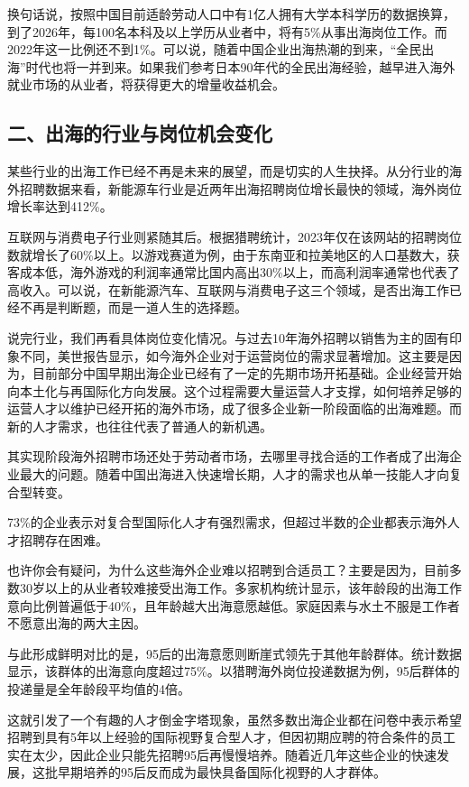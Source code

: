 换句话说，按照中国目前适龄劳动人口中有1亿人拥有大学本科学历的数据换算，到了2026年，每100名本科及以上学历从业者中，将有5\%从事出海岗位工作。而2022年这一比例还不到1\%。可以说，随着中国企业出海热潮的到来，“全民出海”时代也将一并到来。如果我们参考日本90年代的全民出海经验，越早进入海外就业市场的从业者，将获得更大的增量收益机会。

\subsection{二、出海的行业与岗位机会变化}

某些行业的出海工作已经不再是未来的展望，而是切实的人生抉择。从分行业的海外招聘数据来看，新能源车行业是近两年出海招聘岗位增长最快的领域，海外岗位增长率达到412\%。

互联网与消费电子行业则紧随其后。根据猎聘统计，2023年仅在该网站的招聘岗位数就增长了60\%以上。以游戏赛道为例，由于东南亚和拉美地区的人口基数大，获客成本低，海外游戏的利润率通常比国内高出30\%以上，而高利润率通常也代表了高收入。可以说，在新能源汽车、互联网与消费电子这三个领域，是否出海工作已经不再是判断题，而是一道人生的选择题。

说完行业，我们再看具体岗位变化情况。与过去10年海外招聘以销售为主的固有印象不同，美世报告显示，如今海外企业对于运营岗位的需求显著增加。这主要是因为，目前部分中国早期出海企业已经有了一定的先期市场开拓基础。企业经营开始向本土化与再国际化方向发展。这个过程需要大量运营人才支撑，如何培养足够的运营人才以维护已经开拓的海外市场，成了很多企业新一阶段面临的出海难题。而新的人才需求，也往往代表了普通人的新机遇。

其实现阶段海外招聘市场还处于劳动者市场，去哪里寻找合适的工作者成了出海企业最大的问题。随着中国出海进入快速增长期，人才的需求也从单一技能人才向复合型转变。

73\%的企业表示对复合型国际化人才有强烈需求，但超过半数的企业都表示海外人才招聘存在困难。

也许你会有疑问，为什么这些海外企业难以招聘到合适员工？主要是因为，目前多数30岁以上的从业者较难接受出海工作。多家机构统计显示，该年龄段的出海工作意向比例普遍低于40\%，且年龄越大出海意愿越低。家庭因素与水土不服是工作者不愿意出海的两大主因。

与此形成鲜明对比的是，95后的出海意愿则断崖式领先于其他年龄群体。统计数据显示，该群体的出海意向度超过75\%。以猎聘海外岗位投递数据为例，95后群体的投递量是全年龄段平均值的4倍。

这就引发了一个有趣的人才倒金字塔现象，虽然多数出海企业都在问卷中表示希望招聘到具有5年以上经验的国际视野复合型人才，但因初期应聘的符合条件的员工实在太少，因此企业只能先招聘95后再慢慢培养。随着近几年这些企业的快速发展，这批早期培养的95后反而成为最快具备国际化视野的人才群体。

